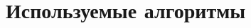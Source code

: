 \documentclass[document.tex]{subfiles}
\begin{document}
\section{Используемые алгоритмы}
\end{document}
